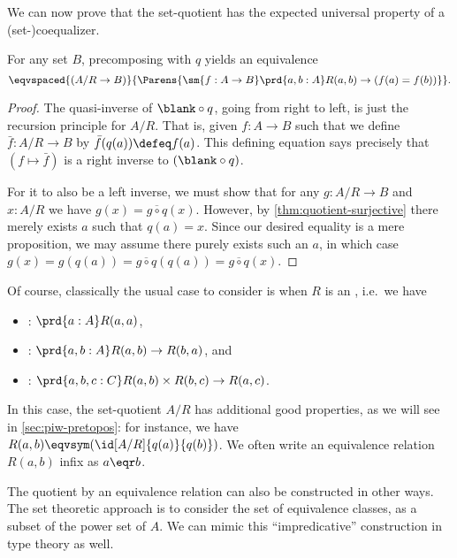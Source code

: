 We can now prove that the set-quotient has the expected universal property of a (set-)coequalizer.

\begin{lem}\label{thm:quotient-ump}
  For any set $B$, precomposing with $q$ yields an equivalence
  \[ \eqvspaced{(A/R \to B)}{\Parens{\sm{f:A\to B} \prd{a,b:A} R(a,b) \to (f(a)=f(b))}}.\]
\end{lem}
\begin{proof}
  The quasi-inverse of $\blank\circ q$, going from right to left, is just the recursion principle for $A/R$.
  That is, given $f:A\to B$ such that
   we define $\bar f:A/R\to B$ by $\bar f(q(a))\defeq f(a)$.
  This defining equation says precisely that $(f\mapsto \bar f)$ is a right inverse to $(\blank\circ q)$.

  For it to also be a left inverse, we must show that for any $g:A/R\to B$ and $x:A/R$ we have $g(x) = \overline{g\circ q}(x)$.
  However, by \cref{thm:quotient-surjective} there merely exists $a$ such that $q(a)=x$.
  Since our desired equality is a mere proposition, we may assume there purely exists such an $a$, in which case $g(x) = g(q(a)) = \overline{g\circ q}(q(a)) = \overline{g\circ q}(x)$.
\end{proof}

Of course, classically the usual case to consider is when $R$ is an , i.e.\ we have
%
%
%
\begin{itemize}
\item {}: $\prd{a:A} R(a,a)$,
\item {}: $\prd{a,b:A} R(a,b) \to R(b,a)$, and
\item {}: $\prd{a,b,c:C} R(a,b) \times R(b,c) \to R(a,c)$.
\end{itemize}
%
In this case, the set-quotient $A/R$ has additional good properties, as we will see in \cref{sec:piw-pretopos}: for instance, we have $R(a,b) \eqvsym (\id[A/R]{q(a)}{q(b)})$.
We often write an equivalence relation $R(a,b)$ infix as $a\eqr b$.

The quotient by an equivalence relation can also be constructed in other ways.
The set theoretic approach is to consider the set of equivalence classes, as a subset of the power set of $A$.
We can mimic this ``impredicative'' construction in type theory as well.

